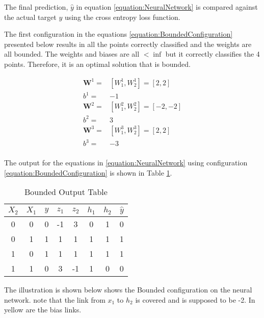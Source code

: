 \documentclass[a4paper,12pt]{article}
\begin{document}
The final prediction, $\hat{y}$ in equation \ref{equation:NeuralNetwork} is compared against the actual target 
$y$ using the cross entropy loss function. 

The first configuration in the equations \ref{equation:BoundedConfiguration} presented below results in all the points correctly classified and the weights are all bounded. The weights and biases are all $ < \inf$ 
but it correctly classifies the 4 points. Therefore, it is an optimal solution that is bounded. 

\begin{equation}
\label{equation:BoundedConfiguration}
\begin{split}
\mathbf{W}^{1} =& [W^{1}_{1},W^{1}_{2}] = [2, 2] \\
b^{1} =& -1 \\
\mathbf{W}^{2} =& [W^{2}_{1}, W^{2}_{2}] = [-2, -2] \\
b^{2} =& 3 \\
\mathbf{W}^{3} =& [W^{3}_{1}, W^{3}_{2}] = [2, 2] \\
b^{3} =& -3 \\
\end{split}
\end{equation}

The output for the equations in \ref{equation:NeuralNetwork} using configuration \ref{equation:BoundedConfiguration} is shown in Table \ref{table:BoundedOutput}.

\begin{table}[ht]
\centering %
\caption{Bounded Output Table} %
\label{table:BoundedOutput} %
\begin{tabular}{c c c c c c c c} %
\hline %
$X_{2}$ & $X_{1}$ & $y$ & $z_{1}$  & $z_{2}$  & $h_{1}$ & $h_{2}$ & $\hat{y}$ \\ [0.5ex] 
\hline
0 & 0 & 0 & -1 &  3  & 0 & 1 & 0 \\
0 & 1 & 1 &  1 &  1  & 1 & 1 & 1 \\
1 & 0 & 1 &  1 &  1  & 1 & 1 & 1 \\
1 & 1 & 0 &  3 & -1  & 1 & 0 & 0 \\ [1ex] %
\hline %
\end{tabular}
\end{table}

The illustration is shown below shows the Bounded configuration on the neural network. note that the link from $x_{1}$ to $h_{2}$ is covered and is supposed to be -2. 
In yellow are the bias links. 
\end{document}
